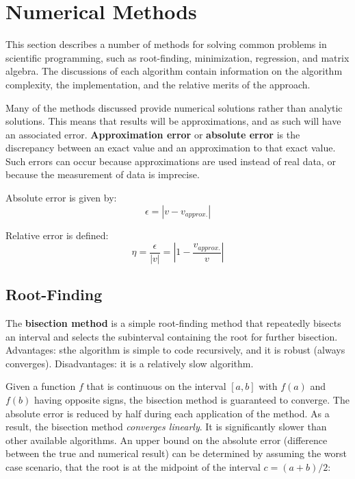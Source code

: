 \section{Numerical Methods}

This section describes a number of methods for solving common problems in scientific programming, such as root-finding, minimization, regression, and matrix algebra. The discussions of each algorithm contain information on the algorithm complexity, the implementation, and the relative merits of the approach. 

Many of the methods discussed provide numerical solutions rather than analytic solutions. This means that results will be approximations, and as such will have an associated error. \textbf{Approximation error} or \textbf{absolute error} is the discrepancy between an exact value and an approximation to that exact value. Such errors can occur because approximations are used instead of real data, or because the measurement of data is imprecise. 

Absolute error is given by:
\begin{equation}
\epsilon = |v-v_{approx.}|
\end{equation}

Relative error is defined:
\begin{equation}
\eta = \frac{\epsilon}{|v|} = |1 - \frac{v_{approx.}}{v}|
\end{equation}

\subsection{Root-Finding}

The \textbf{bisection method} is a simple root-finding method that repeatedly bisects an interval and selects the subinterval containing the root for further bisection. Advantages: sthe algorithm is simple to code recursively, and it is robust (always converges). Disadvantages: it is a relatively slow algorithm. 

Given a function $f$ that is continuous on the interval $[a,b]$ with $f(a)$ and $f(b)$ having opposite signs, the bisection method is guaranteed to converge. The absolute error is reduced by half during each application of the method. As a result, the bisection method \textit{converges linearly}. It is significantly slower than other available algorithms. An upper bound on the absolute error (difference between the true and numerical result) can be determined by assuming the worst case scenario, that the root is at the midpoint of the interval $c = (a+b)/2$:

